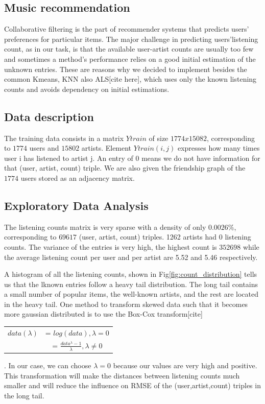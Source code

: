 \subsection{Music recommendation}
Collaborative filtering is the part of recommender systems that predicts users' preferences for particular items. The major challenge in predicting users'listening count, as in our task, is that the available user-artist counts are usually too few and sometimes a method's performance relies on a good initial estimation of the unknown entries. 
These are reasons why we decided to implement besides the common Kmeans, KNN also ALS[cite here], which uses only the known listening counts and avoids dependency on initial estimations.

\subsection{Data description}
The training data consists in a matrix $Ytrain$ of size $1774x15082$, corresponding to $1774$ users and $15802$ artists. Element $Ytrain(i,j)$ expresses how many times user i has listened to artist j. An entry of 0 means we do not have information for that (user, artist, count) triple.
We are also given the friendship graph of the $1774$ users stored as an adjacency matrix.

\subsection{Exploratory Data Analysis}

The listening counts matrix is very sparse with a density of only $0.0026\%$, corresponding to 
$69617$ (user, artist, count) triples. 1262 artists had 0 listening counts.
The variance of the entries is very high, the highest count is $352698$ while the average listening count per user and per artist are 5.52 and 5.46 respectively.

A histogram of all the listening counts, shown in Fig\ref{fig:count_distribution} tells us that the lknown entries follow a heavy tail distribution. The long tail contains a small number of popular items, the well-known artists, and the rest are located in the heavy tail.
One method to transform skewed data such that it becomes more gaussian distributed is to use the Box-Cox transform[cite]\\
\begin{table}[h]
  \centering
  \begin{tabular}{c  c }
  $data(\lambda)$&= $log(data), \lambda = 0$ \\ 
                            &= $\frac{data^\lambda - 1}{\lambda} ,\lambda \neq 0$ \\ 
  \end{tabular}
\end{table}
. In our case, we can choose $\lambda=0$ because our values are very high and positive. This transformation will make the distances between listening counts much smaller and will reduce the influence on RMSE of the (user,artist,count) triples in the long tail. 

